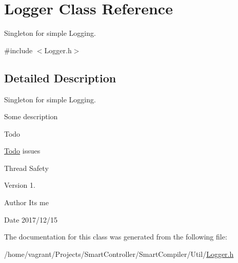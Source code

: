 \hypertarget{class_logger}{}\section{Logger Class Reference}
\label{class_logger}


Singleton for simple Logging.  




{\ttfamily \#include $<$Logger.\+h$>$}



\subsection{Detailed Description}
Singleton for simple Logging. 

Some description

\begin{DoxyRefDesc}{Todo}
\item[\hyperlink{todo__todo000001}{Todo}]issues
\begin{DoxyItemize}
\item Thread Safety
\end{DoxyItemize}\end{DoxyRefDesc}


\begin{DoxyVersion}{Version}
1. 
\end{DoxyVersion}
\begin{DoxyAuthor}{Author}
It\textquotesingle{}s me 
\end{DoxyAuthor}
\begin{DoxyDate}{Date}
2017/12/15 
\end{DoxyDate}


The documentation for this class was generated from the following file\+:\begin{DoxyCompactItemize}
\item 
/home/vagrant/\+Projects/\+Smart\+Controller/\+Smart\+Compiler/\+Util/\hyperlink{_logger_8h}{Logger.\+h}\end{DoxyCompactItemize}
